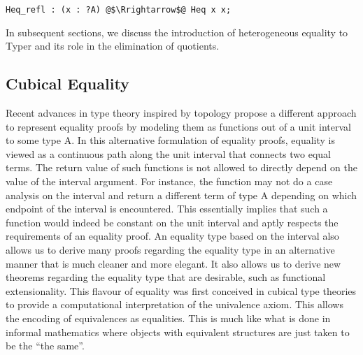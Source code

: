 \documentclass[12pt,twoside,maitrise]{dms}
\theoremstyle{definition}
\numberwithin{equation}{section}
\numberwithin{table}{chapter}
\numberwithin{figure}{chapter}
\begin{document}
\begin{verbatim}
Heq_refl : (x : ?A) @$\Rrightarrow$@ Heq x x;
\end{verbatim}

In subsequent sections, we discuss the introduction of heterogeneous equality to
Typer and its role in the elimination of quotients.


\subsection*{Cubical Equality}

Recent advances in type theory inspired by topology propose a different approach
to represent equality proofs by modeling them as functions out of a unit
interval to some type A. In this alternative formulation of equality proofs,
equality is viewed as a continuous path along the unit interval that connects
two equal terms. The return value of such functions is not allowed to directly
depend on the value of the interval argument. For instance, the function may not
do a case analysis on the interval and return a different term of type A
depending on which endpoint of the interval is encountered. This essentially
implies that such a function would indeed be constant on the unit interval and
aptly respects the requirements of an equality proof. An equality type based on
the interval also allows us to derive many proofs regarding the equality type in
an alternative manner that is much cleaner and more elegant. It also allows us
to derive new theorems regarding the equality type that are desirable, such as
functional extensionality. This flavour of equality was first conceived in
cubical type theories to provide a computational interpretation of the
univalence axiom\cite{bezem2014model}. This allows the encoding of equivalences
as equalities. This is much like what is done in informal mathematics where
objects with equivalent structures are just taken to be the ``the same''.
\end{document}
